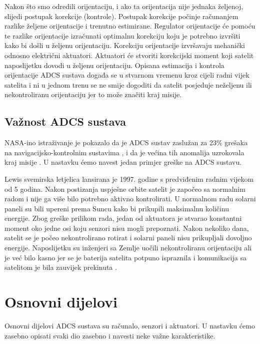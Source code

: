 \documentclass[times, utf8, diplomski, numeric]{templates/template}
\begin{document}
{{{            Nakon što smo odredili orijentaciju, i ako ta orijentacija nije jednaka željenoj, slijedi postupak korekcije (kontrole). Postupak korekcije počinje računanjem razlike željene orijentacije i trenutno estimirane. Regulator orijentacije će pomoću te razlike orijentacije izračunati optimalnu korekciju koju je potrebno izvršiti kako bi došli u željenu orijentaciju. Korekciju orijentacije izvršavaju mehanički odnosno električni aktuatori. Aktuatori će stvoriti korekcijski moment koji satelit naposlijetku dovodi u željenu orijentaciju.
            Opisana estimacija i kontrola orijentacije ADCS sustava događa se u stvarnom vremenu kroz cijeli radni vijek satelita i ni u jednom trenu se ne smije dogoditi da satelit posjeduje neželjenu ili nekontroliranu orijentaciju jer to može značiti kraj misije.
        }

        \subsection{Važnost ADCS sustava}{
            NASA-ino istraživanje je pokazalo da je ADCS sustav zaslužan za 23\% grešaka na navigacijsko-kontrolnim sustavima , i da je većina tih anomalija uzrokovala kraj misije \cite{greskeNaAdcsPostotak}. U nastavku ćemo navest jedan primjer greške na ADCS sustavu.
    
            Lewis svemirska letjelica \cite{lewis} lansirana je 1997. godine s predviđenim radnim vijekom od 5 godina. Nakon postizanja uspješne orbite satelit je započeo sa normalnim radom i nije ga više bilo potrebno aktivno kontrolirati. U normalnom radu solarni paneli su bili upereni prema Suncu kako bi prikupili maksimalnu količinu energije. Zbog greške prilikom rada, jedan od aktuatora je stvarao konstantni moment oko jedne osi koju senzori nisu mogli prepoznati. Nakon nekoliko dana, satelit se je počeo nekontrolirano rotirat i solarni paneli nisu prikupljali dovoljno energije. Naposlijetku su inženjeri sa Zemlje uočili nekontroliranu orijentaciju ali je već bilo kasno jer se je baterija satelita potpuno ispraznila i komunikacija sa satelitom je bila zauvijek prekinuta \cite{greskeNaAdcsSlucajevi}.
        }
    }

    \section{Osnovni dijelovi}{
        Osnovni dijelovi ADCS sustava su računalo, senzori i aktuatori. U nastavku ćemo zasebno opisati svaki dio zasebno i navesti neke važne karakteristike.
 
}}
\end{document}
